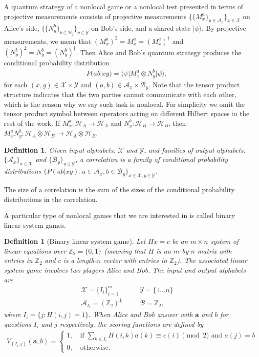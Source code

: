 \documentclass[11pt,letterpaper]{article}
\newcommand{\ket}[1]{|#1\rangle}
\newcommand{\bra}[1]{\langle#1|}
\newcommand{\x}{\otimes}
\newcommand{\Z}{\mathbb{Z}}
\newcommand{\calH}{\mathcal{H}}
\newcommand{\calX}{\mathcal{X}}
\newcommand{\calY}{\mathcal{Y}}
\newcommand{\calA}{\mathcal{A}}
\newcommand{\calB}{\mathcal{B}}
\newcommand{\1}{\mathbb{1}}
\newcommand{\ba}{\pmb{a}}
\newcommand{\pr}[2]{P(#1|#2)}
\newtheorem{definition}[theorem]{Definition}
\theoremstyle{definition}
\begin{document}
A quantum strategy of a nonlocal game or a nonlocal test presented in terms of projective measurements
consists of projective measurements $\{\{M_x^a\}_{a \in \calA_x} \}_{x \in \calX}$ on Alice's side, 
$\{\{N_y^b\}_{b \in \calB_y} \}_{y \in \calY}$ on Bob's side, and a shared state $\ket{\psi}$. 
By projective measurements, we mean that  
$(M_x^a)^2 = M_x^a = (M_x^a)^\dagger$ and $(N_y^b)^2 = N_y^b = (N_y^b)^\dagger$.
Then Alice and Bob's quantum strategy produces the conditional probability distribution
\begin{align}
	\pr{ab}{xy} = \bra{\psi} M_x^a \x N_y^b \ket{\psi},
\end{align}
for each $(x,y) \in \calX \times \calY$ and $(a,b) \in \calA_x \times \calB_y$.
Note that the tensor product structure indicates that the
two parties cannot communicate with each other, 
which is the reason why we say such task is nonlocal.
For simplicity we omit the tensor product symbol between operators 
acting on different Hilbert spaces in the rest of the work. 
If $M_x^a : \calH_A \rightarrow \calH_A$ and $N_y^b: 
\calH_B \rightarrow \calH_B$, 
then $M_x^a N_y^b: \calH_A\x \calH_B \rightarrow \calH_A \x \calH_B$.
\begin{definition}
	Given input alphabets: $\calX$ and $\calY$, and families of output
	alphabets: $\{\calA_x\}_{x \in \calX}$ and $\{\calB_y\}_{y \in \calY}$, a correlation is a family of conditional probability distributions
	$\{\pr{ab}{xy}: a \in \calA_x, b \in \calB_y\}_{x \in \calX, y \in \calY}$.  
\end{definition}
The size of a correlation is the sum of the sizes of the conditional probability distributions in the correlation.

A particular type of nonlocal games that we are interested in is called binary linear system games.
\begin{definition}[Binary linear system game]
 Let $Hx = c$ be an $m \times n$ system of linear equations over $\Z_2 = \{0, 1\}$ (meaning that $H$ is an $m$-by-$n$ matrix with entries in $\Z_2$ and 
 $c$ is a length-$n$ vector with entries in $\Z_2$). 
 The associated linear system game involves two
 players Alice and Bob. 
 The input and output alphabets are 
 \begin{align*}
     \calX = \{I_i\}_{i=1}^m && &\calY = \{1 \dots n\} \\
     \calA_{I_i} = (\Z_2)^{I_i} && &\calB = \Z_2,
 \end{align*}
 where $I_i = \{j : H(i,j) = 1\}$.
 When Alice and Bob answer with $\ba$ and $b$ for questions $I_i$ and
 $j$ respectively,
 the scoring functions are defined by
 \begin{align}
 	V_{(I_i,j)}(\ba, b) =
	\begin{cases}
		1, \quad \text{if } \sum_{k \in I_i} H(i,k) a(k) \equiv c(i) \pmod 2 \text{ and } a(j) = b \\
		0,  \quad \text{otherwise.}
	\end{cases}
\end{align}
\end{definition}
\end{document}
